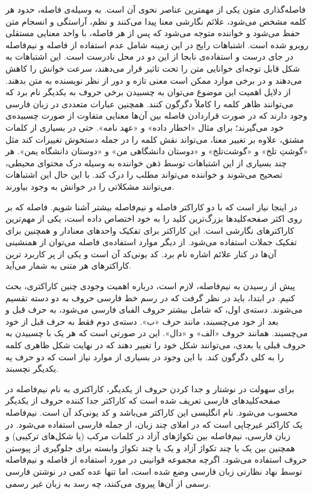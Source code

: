 فاصله‌گذاری متون یکی از مهمترین عناصر نحوی آن است. به وسیله‌ی فاصله، حدود هر کلمه مشخص می‌شود، علائم نگارشی معنا پیدا می‌کنند و نظم، آراستگی و انسجام متن حفظ می‌شود و خواننده متوجه می‌شود که پس از هر فاصله، با واحد معنایی مستقلی روبرو شده است. اشتباهات رایج در این زمینه شامل عدم استفاده از فاصله و نیم‌فاصله در جای درست و استفاده‌ی نابجا از این دو در محل نادرست است. این اشتباهات به شکل قابل توجه‌ای خوانایی متن را تحت تاثیر قرار می‌دهند، سرعت خوانش را کاهش می‌دهند و در برخی موارد ممکن است معنی تازه و دور از نظر نویسنده به متن بدهند. از دلایل اهمیت این موضوع می‌توان به چسبیدن برخی حروف به یکدیگر نام برد که می‌توانند ظاهر کلمه را کاملاً دگرگون کنند. همچنین عبارات متعددی در زبان فارسی وجود دارند که در صورت قراردادن فاصله بین آن‌ها معنایی متفاوت از صورت چسبیده‌ی خود می‌گيرند؛ برای مثال «اخطار داده» و «عهد نامه». حتی در بسیاری از کلمات مشتق، علاوه بر تغییر معنا، می‌تواند نقش کلمه را در جمله دستخوش تغییرات کند مثل «گوشت‌ِ تلخ» و «گوشت‌تلخ» و «دوستان دانشگاهی من» و «دوستان دانشگاه یمن». هر چند بسیاری از این اشتباهات توسط ذهن خواننده به وسیله درک محتوای محیطی، تصحیح می‌شوند و خواننده می‌تواند مطلب را درک کند. با این حال این اشتباهات می‌توانند مشکلاتی را در خوانش به وجود بیاورند.

در اینجا نیاز است که با دو کاراکتر فاصله و نیم‌فاصله بیشتر آشنا شویم. فاصله که بر روی اکثر صفحه‌کلید‌ها بزرگ‌ترین کلید را به خود اختصاص داده است، یکی از مهم‌ترین کاراکتر‌های نگارشی است. این کاراکتر برای تفکیک واحد‌های معنادار و همچنین برای تفکیک جملات استفاده می‌شود. از دیگر موارد استفاده‌ی فاصله می‌توان از همنشینی آن‌ها در کنار علائم اشاره نام برد. کد یونی‌کد
 آن 
است و یکی از پر کاربرد ترین کاراکتر‌های هر متنی به شمار می‌آید. \cite{unicode2020space}


پیش از رسیدن به نیم‌فاصله، لازم است، درباره اهمیت وجودی چنین کاراکتری، بحث کنیم. در ابتدا، باید در نظر گرفت که در رسم خط فارسی حروف به دو دسته تقسیم می‌شوند. دسته‌ی اول، که شامل بیشتر حروف الفبای فارسی می‌شود، به حرف قبل و بعد از خود می‌چسبند، مانند حرف «ب». دسته‌ی دوم فقط به حرف قبل از خود می‌چسبند. همانند حروف «الف» و «دال». این در صورتی است که هر یک با چسبیدن به حروف قبلی یا بعدی، می‌توانند شکل خود را تغییر ‌دهند که در نهایت شکل ظاهری کلمه را به کلی دگرگون کند. با این وجود در بسیاری از موارد نیاز است که دو حرف یه یکدیگر نچسبند.

برای سهولت در نوشتار و جدا کردن حروف از یکدیگر، کاراکتری به نام نیم‌فاصله در صفحه‌کلید‌های فارسی تعریف شده است که کاراکتر جدا کننده حروف از یکدیگر محسوب می‌شود. نام انگلیسی این کاراکتر  می‌باشد و کد یونی‌کد آن
 است.
نیم‌فاصله یک کاراکتر غیرچاپی است که در املای چند زبان، از جمله فارسی استفاده می‌شود. در زبان فارسی، نیم‌فاصله بین تکواژهای آزاد در کلمات مرکب (یا شکل‌های ترکیبی) و همچنین بین یک یا چند تکواژ آزاد و یک یا چند تکواژ وابسته برای جلوگیری از پیوستن حروف استفاده می‌شود.
اگرچه مجموعه قوانینی در مورد استفاده از فاصله و نیم‌فاصله توسط نهاد نظارتی زبان فارسی وضع شده است، اما تنها عده کمی در نوشتن فارسی رسمی از آن‌ها پیروی می‌کنند، چه رسد به زبان غیر رسمی. \cite{unicode2005-ZWNJoriginal}
\cite{unicode2003-ZWNJrecommendation}
\cite{unicode2012-ZWNJ-marks}

